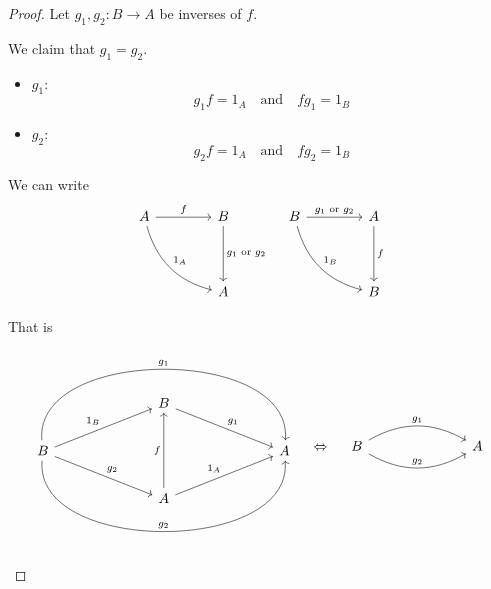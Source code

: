 \documentclass{article}
\begin{document}
    \begin{proof}
        Let $g_1, g_2: B \to A$ be inverses of $f$.

        We claim that $g_1 = g_2$.

        \begin{itemize}
            \item $g_1:$
            \[
                g_1 f = 1_A \quad \text{and} \quad f g_1 = 1_B
            \]
            \item $g_2:$
            \[
                g_2 f = 1_A \quad \text{and} \quad f g_2 = 1_B
            \]
        \end{itemize}

        We can write
        \[
            \begin{array}{c c} %
                \begin{tikzcd}[column sep=4em, row sep=4em]
                    A  \arrow[r, "f"] \arrow[dr, bend right, "1_A"]
                    & B  \arrow[d, "g_1 \text{ or } g_2"]\\
                    & A
                \end{tikzcd}
                &
                \begin{tikzcd}[column sep=4em, row sep=4em]
                    B  \arrow[r, "g_1 \text{ or } g_2"] \arrow[dr, bend right, "1_B"]
                    & A  \arrow[d, "f"]\\
                    & B
                \end{tikzcd} \\
            \end{array}
        \]

        That is
        \[
            \begin{tikzcd}[column sep=7em, row sep=2em]
                & B \arrow[dr, "g_1"]  \\
                B \arrow[ur,  "1_B"] \arrow[dr, "g_2"] \arrow[rr, bend left = 95, "g_1"] \arrow[rr, bend right=95, "g_2"] & & A\\
                & A \arrow[ur, "1_A"] \arrow[uu, "f"]
            \end{tikzcd} \quad
            \Leftrightarrow \quad
            \begin{tikzcd}[column sep=7em, row sep=2em]
                B\arrow[bend left, "g_1"]{r}\arrow[bend right, "g_2"]{r}&A
            \end{tikzcd}
        \]


\end{proof}
\end{document}
